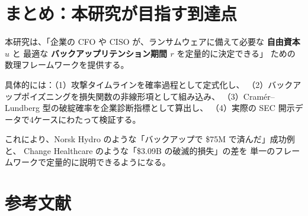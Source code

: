 \documentclass[a4paper,11pt]{article}
\theoremstyle{definition}
\begin{document}
\section*{まとめ：本研究が目指す到達点}

\begin{tcolorbox}[strategybox, title={研究のエレベーターピッチ}]
  本研究は、「企業の CFO や CISO が、ランサムウェアに備えて必要な \textbf{自由資本 $u$} と
  最適な \textbf{バックアップリテンション期間 $r$} を定量的に決定できる」
  ための数理フレームワークを提供する。

  具体的には：（1）攻撃タイムラインを確率過程として定式化し、
  （2）バックアップポイズニングを損失関数の非線形項として組み込み、
  （3）Cramér--Lundberg 型の破綻確率を企業診断指標として算出し、
  （4）実際の SEC 開示データで4ケースにわたって検証する。

  これにより、Norsk Hydro のような「バックアップで \$75M で済んだ」成功例と、
  Change Healthcare のような「\$3.09B の破滅的損失」の差を
  単一のフレームワークで定量的に説明できるようになる。
\end{tcolorbox}

\section*{参考文献}
\end{document}
